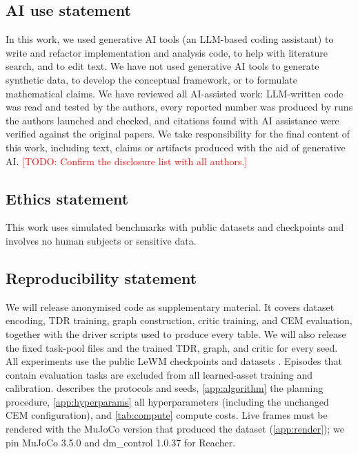 \documentclass{article} %
\newcommand{\todo}[1]{\textcolor{red}{[TODO: #1]}}
\begin{document}
\subsection*{AI use statement}
In this work, we used generative AI tools (an LLM-based coding assistant) to write and refactor
implementation and analysis code, to help with literature search, and to edit text. We have not
used generative AI tools to generate synthetic data, to develop the conceptual framework, or to
formulate mathematical claims. We have reviewed all AI-assisted work: LLM-written code was read
and tested by the authors, every reported number was produced by runs the authors launched and
checked, and citations found with AI assistance were verified against the original papers. We
take responsibility for the final content of this work, including text, claims or artifacts
produced with the aid of generative AI. \todo{Confirm the disclosure list with all authors.}

\subsection*{Ethics statement}
This work uses simulated benchmarks with public datasets and checkpoints and involves no human
subjects or sensitive data.

\subsection*{Reproducibility statement}
We will release anonymised code as supplementary material. It covers dataset encoding, TDR
training, graph construction, critic training, and CEM evaluation, together with the driver
scripts used to produce every table. We will also release the fixed task-pool files and the
trained TDR, graph, and critic for every seed. All experiments use the public LeWM checkpoints
and datasets \citep{lewm}. Episodes that contain evaluation tasks are excluded from all
learned-asset training and calibration.  describes the protocols and seeds,
\cref{app:algorithm} the planning procedure, \cref{app:hyperparams} all hyperparameters
(including the unchanged CEM configuration), and \cref{tab:compute} compute costs. Live
frames must be rendered with the MuJoCo version that produced the dataset
(\cref{app:render}); we pin MuJoCo 3.5.0 and dm\_control 1.0.37 for Reacher.
\end{document}
